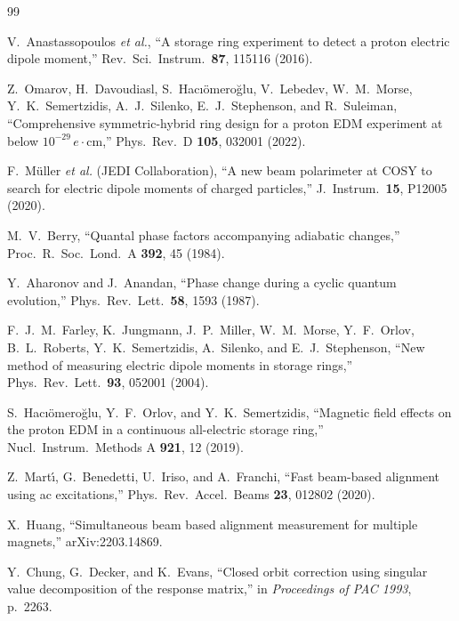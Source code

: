\documentclass[aps,prab,reprint,superscriptaddress,nofootinbib]{revtex4-2}
\begin{document}
	\begin{thebibliography}{99}

		V.~Anastassopoulos \emph{et al.},
		``A storage ring experiment to detect a proton electric dipole moment,''
		Rev.\ Sci.\ Instrum.\ \textbf{87}, 115116 (2016).

		Z.~Omarov, H.~Davoudiasl, S.~Hac{\i}\"omero\u{g}lu, V.~Lebedev,
		W.~M.~Morse, Y.~K.~Semertzidis, A.~J.~Silenko, E.~J.~Stephenson, and
		R.~Suleiman,
		``Comprehensive symmetric-hybrid ring design for a proton EDM experiment at
		below $10^{-29}\,e\!\cdot\!$cm,''
		Phys.\ Rev.\ D \textbf{105}, 032001 (2022).

		F.~M\"uller \emph{et al.} (JEDI Collaboration),
		``A new beam polarimeter at COSY to search for electric dipole moments of
		charged particles,''
		J.\ Instrum.\ \textbf{15}, P12005 (2020).

		M.~V.~Berry,
		``Quantal phase factors accompanying adiabatic changes,''
		Proc.\ R.\ Soc.\ Lond.\ A \textbf{392}, 45 (1984).

		Y.~Aharonov and J.~Anandan,
		``Phase change during a cyclic quantum evolution,''
		Phys.\ Rev.\ Lett.\ \textbf{58}, 1593 (1987).

		F.~J.~M.~Farley, K.~Jungmann, J.~P.~Miller, W.~M.~Morse, Y.~F.~Orlov,
		B.~L.~Roberts, Y.~K.~Semertzidis, A.~Silenko, and E.~J.~Stephenson,
		``New method of measuring electric dipole moments in storage rings,''
		Phys.\ Rev.\ Lett.\ \textbf{93}, 052001 (2004).

		S.~Hac{\i}\"omero\u{g}lu, Y.~F.~Orlov, and Y.~K.~Semertzidis,
		``Magnetic field effects on the proton EDM in a continuous all-electric
		storage ring,''
		Nucl.\ Instrum.\ Methods A \textbf{921}, 12 (2019).

		Z.~Mart\'{\i}, G.~Benedetti, U.~Iriso, and A.~Franchi,
		``Fast beam-based alignment using ac excitations,''
		Phys.\ Rev.\ Accel.\ Beams \textbf{23}, 012802 (2020).

		X.~Huang,
		``Simultaneous beam based alignment measurement for multiple magnets,''
		arXiv:2203.14869.

		Y.~Chung, G.~Decker, and K.~Evans,
		``Closed orbit correction using singular value decomposition of the response
		matrix,''
		in \emph{Proceedings of PAC 1993}, p.~2263.


\end{thebibliography}
\end{document}
